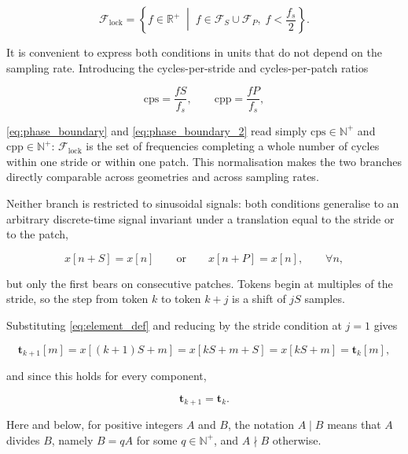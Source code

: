 \begin{equation}
\label{eq:flock}
\mathcal F_{\mathrm{lock}}
=
\left\lbrace{}
f\in\mathbb{R}^{+}
\;\middle|\;
f\in\mathcal{F}_{S}\cup\mathcal{F}_{P},
\;
f<\frac{f_s}{2}
\right\rbrace.
\end{equation}

It is convenient to express both conditions in units that do not depend on the sampling rate. Introducing the cycles-per-stride and cycles-per-patch ratios

\begin{equation*}
\mathrm{cps}
=
\frac{f S}{f_s},
\qquad
\mathrm{cpp}
=
\frac{f P}{f_s},
\end{equation*}

\autoref{eq:phase_boundary} and \autoref{eq:phase_boundary_2} read simply $\mathrm{cps}\in\mathbb{N}^{+}$ and $\mathrm{cpp}\in\mathbb{N}^{+}$: $\mathcal{F}_{\mathrm{lock}}$ is the set of frequencies completing a whole number of cycles within one stride or within one patch. This normalisation makes the two branches directly comparable across geometries and across sampling rates.

Neither branch is restricted to sinusoidal signals: both conditions generalise to an arbitrary discrete-time signal invariant under a translation equal to the stride or to the patch,

\begin{equation*}
x[n+S]
=
x[n]
\qquad\text{or}\qquad
x[n+P]
=
x[n],
\qquad
\forall n,
\end{equation*}

but only the first bears on consecutive patches. Tokens begin at multiples of the stride, so the step from token $k$ to token $k+j$ is a shift of $jS$ samples. 


Substituting \autoref{eq:element_def} and reducing by the stride condition at $j=1$ gives

\begin{equation}
\label{eq:collapse_S}
\mathbf{t}_{k+1}[m]
=
x[(k+1)S+m]
=
x[kS+m+S]
=
x[kS+m]
=
\mathbf{t}_k[m],
\end{equation}

and since this holds for every component,

\begin{equation}
\label{eq:token_collapse}
\mathbf{t}_{k+1}
=
\mathbf{t}_k.
\end{equation}

Here and below, for positive integers $A$ and $B$, the notation $A\mid B$ means that $A$ divides $B$, namely $B=qA$ for some $q\in\mathbb{N}^{+}$, and $A\nmid B$ otherwise.

